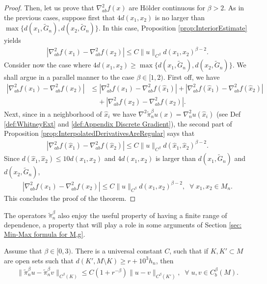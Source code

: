 \documentclass[11pt,reqno]{amsart}
\numberwithin{equation}{section}
\theoremstyle{plain}
\def\grad{\nabla}
\newcommand{\norm}[1]{\lVert#1\rVert}
\begin{document}
\begin{proof}
  Then, let us prove that $\nabla^2_{ab}f(x)$ are H\"older continuous for $\beta>2$. As in the previous cases, suppose first that $4d(x_1,x_2)$ is no larger than $\max\{d(x_1,\tilde G_n),d(x_2,\tilde G_n)\}$. In this case, Proposition \ref{prop:InteriorEstimate} yields
  \begin{align*}
    |\nabla_{ab}^2f(x_1)-\nabla_{ab}^2f(x_2)|\leq C\|u\|_{C^\beta}d(x_1,x_2)^{\beta-2}.
  \end{align*}
  Consider now the case where $4d(x_1,x_2) \geq \max\{d(x_1,\tilde G_n),d(x_2,\tilde G_n)\}$. We shall argue in a parallel manner to the case $\beta \in [1,2)$. First off, we have
  \begin{align*}
    |\nabla_{ab}^2f(x_1)-\nabla_{ab}^2f(x_2)| & \leq |\nabla_{ab}^2f(x_1)-\nabla_{ab}^2f(\hat x_1)| +|\nabla_{ab}^2f(\hat x_1)-\nabla_{ab}^2f(\hat x_2)|\\
      & \;\;\;\;+|\nabla_{ab}^2f(\hat x_2)-\nabla_{ab}^2f(x_2)|.   	 
  \end{align*}	  
  Next, since in a neighborhood of $\hat x_i$ we have $\grad^2 \tilde \pi_n^\beta u(x)=\nabla^2_n u(\hat x_i)$ (see Def \ref{def:WhitneyExt} and \ref{def:Appendix Discrete Gradient}), the second part of Proposition \ref{prop:InterpolatedDerivativesAreRegular} says that
  \begin{align*}
    |\nabla_{ab}^2f(\hat x_1)-\nabla_{ab}^2f(\hat x_2)|\leq C\|u\|_{C^\beta}d(\hat x_1,\hat x_2)^{\beta-2}.
  \end{align*}	     
  Since $d(\hat x_1,\hat x_2) \leq 10d(x_1,x_2)$ and $4d(x_1,x_2)$ is larger than $d(x_1,\tilde G_n)$ and $d(x_2,\tilde G_n)$,
  \begin{align*}
    |\nabla_{ab}^2f(x_1)-\nabla_{ab}^2f(x_2)|\leq C\|u\|_{C^\beta}d(x_1,x_2)^{\beta-2},\;\;\forall\;x_1,x_2\in M_{n}.	  
  \end{align*}	   
  This concludes the proof of the theorem.
\end{proof}

The operators $\tilde \pi_n^\beta$ also enjoy the useful property of having a finite range of dependence, a property that will play a role in some arguments of Section \ref{sec: Min-Max formula for M,g}.

\begin{lem}\label{lem:EnTnRangeOfDependence}
  Assume that $\beta\in [0,3)$.  There is a universal constant $C$, such that if $K,K'\subset M$ are open sets such that $d(K', M\setminus K)\geq r+10^3h_n$, then
  \begin{align*}
    \norm{\tilde \pi_n^\beta u -\tilde \pi_n^\beta v}_{C^\beta(K)}\leq C(1+r^{-\beta}) \norm{u-v}_{C^\beta(K')},\;\;\forall\;u,v\in C^\beta_b(M).
  \end{align*}
\end{lem}
\end{document}
